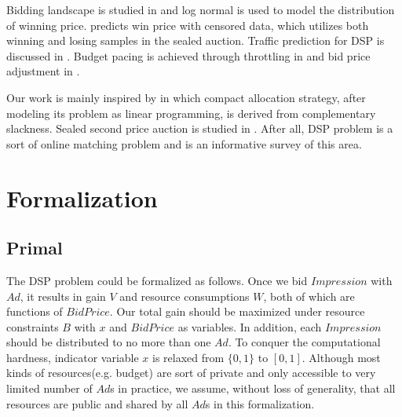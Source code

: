 \documentclass{article}
\begin{document}

Bidding landscape is studied in \cite{YingCui2011} and log normal is used to model the distribution of winning price.
\cite{Wu2015} predicts win price with censored data, which utilizes both winning and losing samples in the sealed auction.
Traffic prediction for DSP is discussed in \cite{Traffic2016}.
Budget pacing is achieved through throttling in \cite{Throttle2015} and bid price adjustment in \cite{Pacing2013}.

Our work is mainly inspired by \cite{YeChen2011} in which compact allocation strategy,
    after modeling its problem as linear programming, is derived from complementary slackness.
Sealed second price auction is studied in \cite{SSPA1961}.
After all, DSP problem is a sort of online matching problem and \cite{Mehta} is an informative survey of this area.

\section{Formalization} \label{Formalization}

\subsection{Primal}

The DSP problem could be formalized as follows.
Once we bid $Impression$ with $Ad$, it results in gain $V$ and resource consumptions $W$, both of which are functions of $BidPrice$.
Our total gain should be maximized under resource constraints $B$ with $x$ and $BidPrice$ as variables.
In addition, each $Impression$ should be distributed to no more than one $Ad$.
To conquer the computational hardness, indicator variable $x$ is relaxed from $\{0, 1\}$ to $[0, 1]$.
Although most kinds of resources(e.g. budget) are sort of private and only accessible to very limited number of $Ad$s in practice,
    we assume, without loss of generality, that all resources are public and shared by all $Ad$s in this formalization.
\end{document}

